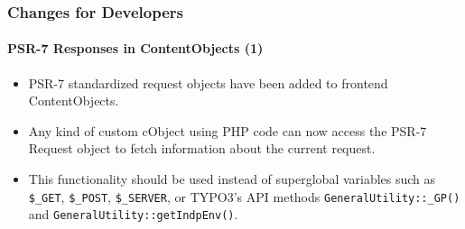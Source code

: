 %

\begin{frame}[fragile]
	\frametitle{Changes for Developers}
	\framesubtitle{PSR-7 Responses in ContentObjects (1)}

	\begin{itemize}
		\item PSR-7 standardized request objects have been added to frontend ContentObjects.
		\item Any kind of custom cObject using PHP code can now access the PSR-7
			Request object to fetch information about the current request.
		\item This functionality should be used instead of superglobal variables
			such as\newline
			\texttt{\$\_GET}, \texttt{\$\_POST}, \texttt{\$\_SERVER},
			or TYPO3's API methods \texttt{GeneralUtility::\_GP()} and
			\texttt{GeneralUtility::getIndpEnv()}.

	\end{itemize}
\end{frame}

